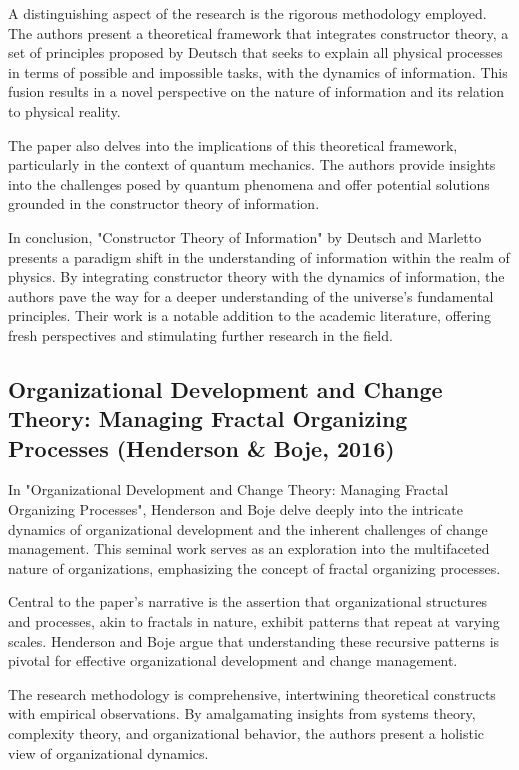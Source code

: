 \documentclass[sn-nature]{sn-jnl}%
\theoremstyle{thmstyleone}%
\theoremstyle{thmstyletwo}%
\theoremstyle{thmstylethree}%
\begin{document}
A distinguishing aspect of the research is the rigorous methodology employed. The authors present a theoretical framework that integrates constructor theory, a set of principles proposed by Deutsch that seeks to explain all physical processes in terms of possible and impossible tasks, with the dynamics of information. This fusion results in a novel perspective on the nature of information and its relation to physical reality.

The paper also delves into the implications of this theoretical framework, particularly in the context of quantum mechanics. The authors provide insights into the challenges posed by quantum phenomena and offer potential solutions grounded in the constructor theory of information.

In conclusion, "Constructor Theory of Information" by Deutsch and Marletto presents a paradigm shift in the understanding of information within the realm of physics. By integrating constructor theory with the dynamics of information, the authors pave the way for a deeper understanding of the universe's fundamental principles. Their work is a notable addition to the academic literature, offering fresh perspectives and stimulating further research in the field.
\subsection{Organizational Development and Change Theory: Managing Fractal Organizing Processes (Henderson \& Boje, 2016)\cite{henderson_organizational_2015}}

In "Organizational Development and Change Theory: Managing Fractal Organizing Processes", Henderson and Boje delve deeply into the intricate dynamics of organizational development and the inherent challenges of change management. This seminal work serves as an exploration into the multifaceted nature of organizations, emphasizing the concept of fractal organizing processes.

Central to the paper's narrative is the assertion that organizational structures and processes, akin to fractals in nature, exhibit patterns that repeat at varying scales. Henderson and Boje argue that understanding these recursive patterns is pivotal for effective organizational development and change management.

The research methodology is comprehensive, intertwining theoretical constructs with empirical observations. By amalgamating insights from systems theory, complexity theory, and organizational behavior, the authors present a holistic view of organizational dynamics.
\end{document}
